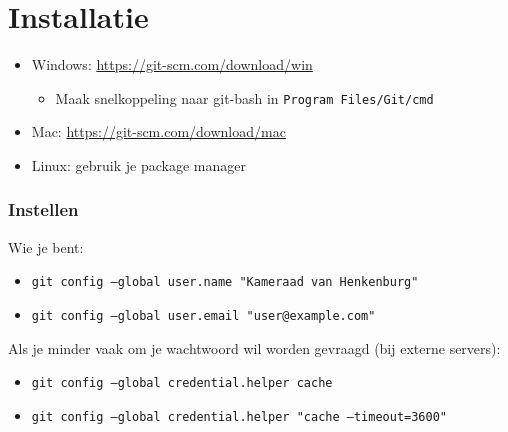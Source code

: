 \section{Installatie}

\begin{frame}
	\begin{itemize}
		\item Windows: \url{https://git-scm.com/download/win}
			\begin{itemize}
				\item \small{Maak snelkoppeling naar git-bash in \tt{Program Files/Git/cmd}}
			\end{itemize}
		\item Mac: \url{https://git-scm.com/download/mac}
		\item Linux: gebruik je package manager
	\end{itemize}
\end{frame}

\begin{frame}
	\frametitle{Instellen}

	Wie je bent:
	\begin{itemize}
		\item \tt{git config --global user.name "Kameraad van Henkenburg"}
		\item \tt{git config --global user.email "user@example.com"}
	\end{itemize}

	Als je minder vaak om je wachtwoord wil worden gevraagd (bij externe servers):

	\begin{itemize}
		\item \tt{git config --global credential.helper cache}
		\item \tt{git config --global credential.helper "cache --timeout=3600"}
	\end{itemize}
\end{frame}
